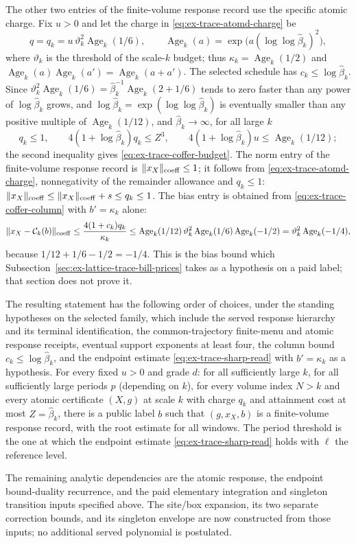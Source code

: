 The other two entries of the finite-volume response record use the specific atomic charge. Fix
\(u>0\) and let the charge in \eqref{eq:ex-trace-atomd-charge} be
\[
 q=q_k=u\,\vartheta_k^2\operatorname{Age}_k(1/6),
 \qquad
 \operatorname{Age}_k(a)=\exp\bigl(a(\log\log\widehat\beta_k)^2\bigr),
\]
where \(\vartheta_k\) is the threshold of the scale-\(k\) budget; thus
\(\kappa_k=\operatorname{Age}_k(1/2)\) and
\(\operatorname{Age}_k(a)\operatorname{Age}_k(a')=\operatorname{Age}_k(a+a')\).
The selected schedule has \(c_k\leq\log\widehat\beta_k\). Since
\(\vartheta_k^2\operatorname{Age}_k(1/6)=\widehat\beta_k^{-1}
\operatorname{Age}_k(2+1/6)\) tends to zero faster than any power of
\(\log\widehat\beta_k\) grows, and
\(\log\widehat\beta_k=\exp(\log\log\widehat\beta_k)\) is eventually
smaller than any positive multiple of \(\operatorname{Age}_k(1/12)\), and
\(\widehat\beta_k\to\infty\), for all large \(k\)
\[
 q_k\leq1,\qquad 4(1+\log\widehat\beta_k)q_k\leq Z^3,\qquad
 4(1+\log\widehat\beta_k)u\leq\operatorname{Age}_k(1/12);
\]
the second inequality gives \eqref{eq:ex-trace-coffer-budget}. The norm
entry of the finite-volume response record is \(\|x_X\|_{\rm coeff}\leq1\); it follows from
\eqref{eq:ex-trace-atomd-charge}, nonnegativity of the remainder allowance
and \(q_k\leq1\):
\(\|x_X\|_{\rm coeff}\leq\|x_X\|_{\rm coeff}+s\leq q_k\leq1\). The bias
entry is obtained from \eqref{eq:ex-trace-coffer-column} with
\(b'=\kappa_k\) alone:
\[
 \|x_X-\mathcal C_k(b)\|_{\rm coeff}
 \leq\frac{4(1+c_k)q_k}{\kappa_k}
 \leq\operatorname{Age}_k(1/12)\,\vartheta_k^2
      \operatorname{Age}_k(1/6)\operatorname{Age}_k(-1/2)
 =\vartheta_k^2\operatorname{Age}_k(-1/4),
\]
because \(1/12+1/6-1/2=-1/4\). This is the bias bound which
Subsection~\ref{sec:ex-lattice-trace-bill-prices} takes as a hypothesis on a
paid label; that section does not prove it.

The resulting statement has the following order of
choices, under the standing hypotheses on the selected family, which
include the served response hierarchy and its terminal identification,
the common-trajectory finite-menu and atomic response receipts, eventual
support exponents at least four, the column bound
$c_k\le\log\widehat\beta_k$, and the endpoint estimate
\eqref{eq:ex-trace-sharp-read} with
\(b'=\kappa_k\) as a hypothesis. For every fixed \(u>0\) and grade
\(d\): for all sufficiently
large \(k\), for all sufficiently large periods \(p\) (depending on \(k\)),
for every volume index \(N>k\) and every atomic certificate \((X,g)\) at
scale \(k\) with charge \(q_k\) and attainment cost at most
\(Z=\widehat\beta_k\), there is a public label \(b\) such that
\((g,x_X,b)\) is a finite-volume response record, with the root estimate for all windows. The
period threshold is the one at which the endpoint estimate
\eqref{eq:ex-trace-sharp-read} holds with \(\ell\) the reference level.

The remaining analytic dependencies are the atomic response, the endpoint
bound-duality recurrence, and the paid elementary integration and singleton
transition inputs specified above. The site/box expansion, its two separate
correction bounds, and its singleton envelope are now constructed from
those inputs; no additional served polynomial is postulated.
